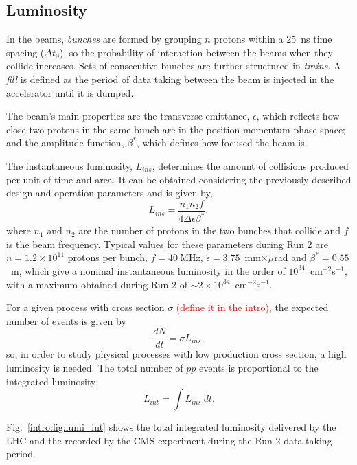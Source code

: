 \documentclass[../main.tex]{subfiles}
\begin{document}
\subsection{Luminosity}

In the beams, \textit{bunches} are formed by grouping $n$ protons within a 25~ns time spacing ($\Delta t_0$), so the probability of interaction between the beams when they collide increases. Sets of consecutive bunches are further structured in \textit{trains}. A \textit{fill} is defined as the period of data taking between the beam is injected in the accelerator until it is dumped. 

The beam's main properties are the transverse emittance, $\epsilon$, which reflects how close two protons in the same bunch are in the position-momentum phase space; and the amplitude function, $\beta^*$, which defines how focused the beam is.


The instantaneous luminosity, $L_{ins}$, determines the amount of collisions produced per unit of time and area. It can be obtained considering the previously described design and operation parameters and is given by,
\begin{equation}
L_{ins} = \frac{n_1 n_2 f}{4\Delta\epsilon\beta^*},
\label{intro:eq:lumi_inst}
\end{equation}
where $n_1$ and $n_2$ are the number of protons in the two bunches that collide and $f$ is the beam frequency. Typical values for these parameters during Run 2 are $n=1.2\times10^{11}$ protons per bunch, $f=40~$MHz, $\epsilon=3.75$~mm$\times\mu$rad and $\beta^*=0.55$~m, which give a nominal instantaneous luminosity in the order of $10^{34}$~cm${}^{-2}$s${}^{-1}$, with a maximum obtained during Run 2 of $\sim2\times10^{34}$~cm${}^{-2}$s${}^{-1}$. 

For a given process with cross section $\sigma$ \textcolor{red}{(define it in the intro)}, the expected number of events is given by
\begin{equation}
\frac{dN}{dt} = \sigma L_{ins},
\end{equation}
so, in order to study physical processes with low production cross section, a high luminosity is needed. The total number of $pp$ events is proportional to the integrated luminosity:
\begin{equation}
L_{int} = \int L_{ins}~dt.
\end{equation}

Fig.~\ref{intro:fig:lumi_int} shows the total integrated luminosity delivered by the LHC and the recorded by the CMS experiment during the Run 2 data taking period.
\end{document}
